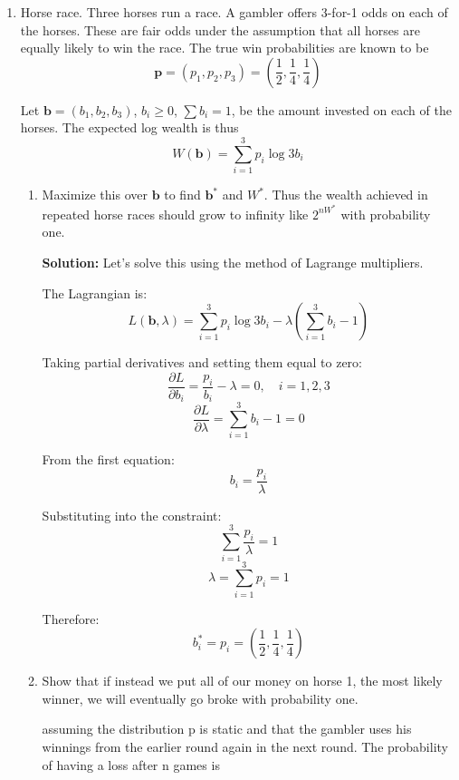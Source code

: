 \documentclass{article}
\begin{document}
\begin{enumerate}
    \item Horse race. Three horses run a race. A gambler offers 3-for-1 odds on each of the horses. These are fair odds under the assumption that all horses are equally likely to win the race. The true win probabilities are known to be
    \[
        \mathbf{p} = (p_1, p_2, p_3) = (\frac{1}{2}, \frac{1}{4}, \frac{1}{4})
    \]
    
    Let $\mathbf{b} = (b_1, b_2, b_3)$, $b_i \geq 0$, $\sum b_i = 1$, be the amount invested on each of the horses. The expected log wealth is thus
    \[
        W(\mathbf{b}) = \sum_{i=1}^3 p_i \log 3b_i
    \]
    
    \begin{enumerate}
        \item Maximize this over $\mathbf{b}$ to find $\mathbf{b}^*$ and $W^*$. Thus the wealth achieved in repeated horse races should grow to infinity like $2^{nW^*}$ with probability one.
        
        \textbf{Solution:} Let's solve this using the method of Lagrange multipliers.

        The Lagrangian is:
        \[
            L(\mathbf{b}, \lambda) = \sum_{i=1}^3 p_i \log 3b_i - \lambda(\sum_{i=1}^3 b_i - 1)
        \]

        Taking partial derivatives and setting them equal to zero:
        \[
            \frac{\partial L}{\partial b_i} = \frac{p_i}{b_i} - \lambda = 0, \quad i = 1,2,3
        \]
        \[
            \frac{\partial L}{\partial \lambda} = \sum_{i=1}^3 b_i - 1 = 0
        \]

        From the first equation:
        \[
            b_i = \frac{p_i}{\lambda}
        \]

        Substituting into the constraint:
        \[
            \sum_{i=1}^3 \frac{p_i}{\lambda} = 1
        \]
        \[
            \lambda = \sum_{i=1}^3 p_i = 1
        \]

        Therefore:
        \[
            b_i^* = p_i = (\frac{1}{2}, \frac{1}{4}, \frac{1}{4})
        \]

        \item Show that if instead we put all of our money on horse 1, the most likely winner, we will eventually go broke with probability one.
        
        assuming the distribution p is static and that the gambler uses his winnings 
        from the earlier round again in the next round. The probability of having a loss after n games is


\end{enumerate}
\end{enumerate}
\end{document}
